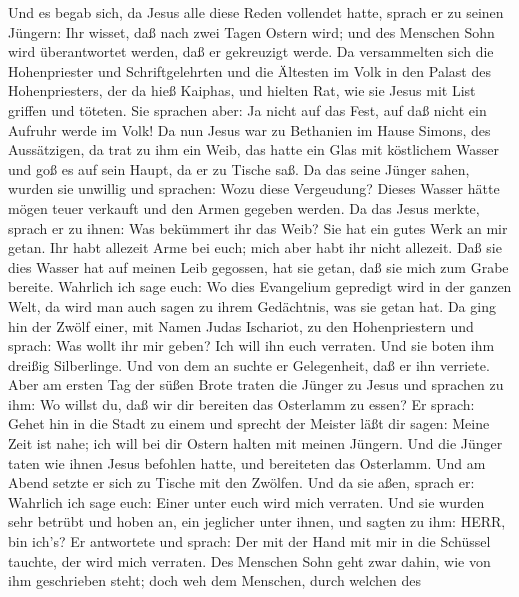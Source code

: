  Und es begab sich, da Jesus alle diese Reden vollendet
hatte, sprach er zu seinen Jüngern:  Ihr wisset, daß nach
zwei Tagen Ostern wird; und des Menschen Sohn wird überantwortet werden,
daß er gekreuzigt werde.  Da versammelten sich die
Hohenpriester und Schriftgelehrten und die Ältesten im Volk in den
Palast des Hohenpriesters, der da hieß Kaiphas,  und hielten
Rat, wie sie Jesus mit List griffen und töteten.  Sie
sprachen aber: Ja nicht auf das Fest, auf daß nicht ein Aufruhr werde im
Volk!  Da nun Jesus war zu Bethanien im Hause Simons, des
Aussätzigen,  da trat zu ihm ein Weib, das hatte ein Glas
mit köstlichem Wasser und goß es auf sein Haupt, da er zu Tische saß.
 Da das seine Jünger sahen, wurden sie unwillig und
sprachen: Wozu diese Vergeudung?  Dieses Wasser hätte mögen
teuer verkauft und den Armen gegeben werden.  Da das Jesus
merkte, sprach er zu ihnen: Was bekümmert ihr das Weib? Sie hat ein
gutes Werk an mir getan.  Ihr habt allezeit Arme bei euch;
mich aber habt ihr nicht allezeit.  Daß sie dies Wasser hat
auf meinen Leib gegossen, hat sie getan, daß sie mich zum Grabe bereite.
 Wahrlich ich sage euch: Wo dies Evangelium gepredigt wird
in der ganzen Welt, da wird man auch sagen zu ihrem Gedächtnis, was sie
getan hat.  Da ging hin der Zwölf einer, mit Namen Judas
Ischariot, zu den Hohenpriestern  und sprach: Was wollt ihr
mir geben? Ich will ihn euch verraten. Und sie boten ihm dreißig
Silberlinge.  Und von dem an suchte er Gelegenheit, daß er
ihn verriete.  Aber am ersten Tag der süßen Brote traten
die Jünger zu Jesus und sprachen zu ihm: Wo willst du, daß wir dir
bereiten das Osterlamm zu essen?  Er sprach: Gehet hin in
die Stadt zu einem und sprecht der Meister läßt dir sagen: Meine Zeit
ist nahe; ich will bei dir Ostern halten mit meinen Jüngern.
 Und die Jünger taten wie ihnen Jesus befohlen hatte, und
bereiteten das Osterlamm.  Und am Abend setzte er sich zu
Tische mit den Zwölfen.  Und da sie aßen, sprach er:
Wahrlich ich sage euch: Einer unter euch wird mich verraten.
 Und sie wurden sehr betrübt und hoben an, ein jeglicher
unter ihnen, und sagten zu ihm: HERR, bin ich's?  Er
antwortete und sprach: Der mit der Hand mit mir in die Schüssel tauchte,
der wird mich verraten.  Des Menschen Sohn geht zwar dahin,
wie von ihm geschrieben steht; doch weh dem Menschen, durch welchen des
